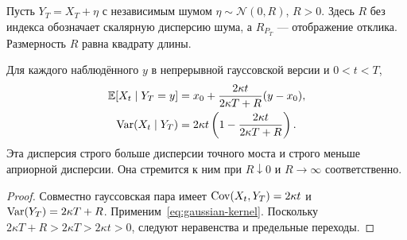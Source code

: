 \section{}
\label{sec:noise}
{Пусть $Y_T=X_T+\eta$ с независимым шумом $\eta\sim\mathcal N(0,R)$, $R>0$. Здесь $R$ без индекса обозначает скалярную дисперсию шума, а $R_{P_T}$ --- отображение отклика. Размерность $R$ равна квадрату длины.}
\begin{proposition}
\label{prop:noisy-contraction}
{Для каждого наблюдённого $y$ в непрерывной гауссовской версии и $0<t<T$,}
\begin{align}
\mathbb E[X_t\mid Y_T=y]&=x_0+\frac{2\kappa t}{2\kappa T+R}(y-x_0),\label{eq:noisy-mean}\\
\operatorname{Var}(X_t\mid Y_T)&=2\kappa t\left(1-\frac{2\kappa t}{2\kappa T+R}\right).
\label{eq:noisy-var}
\end{align}
{Эта дисперсия строго больше дисперсии точного моста и строго меньше априорной дисперсии. Она стремится к ним при $R\downarrow0$ и $R\to\infty$ соответственно.}
\end{proposition}
\begin{proof}
{Совместно гауссовская пара имеет $\operatorname{Cov}(X_t,Y_T)=2\kappa t$ и $\operatorname{Var}(Y_T)=2\kappa T+R$. Применим~\eqref{eq:gaussian-kernel}. Поскольку $2\kappa T+R>2\kappa T>2\kappa t>0$, следуют неравенства и предельные переходы.}
\end{proof}


